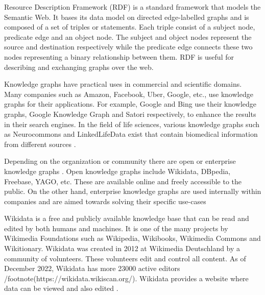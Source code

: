 Resource Description Framework (RDF) is a standard framework that models the Semantic Web. It bases its data model on directed edge-labelled graphs and is composed of a set of triples or statements. Each triple consist of a subject node, predicate edge and an object node. The subject and object nodes represent the source and destination respectively while the predicate edge connects these two nodes representing a binary relationship between them. RDF is useful for describing and exchanging graphs over the web.

Knowledge graphs have practical uses in commercial and scientific domains. Many companies such as Amazon, Facebook, Uber, Google, etc., use knowledge graphs for their applications. For example, Google and Bing use their knowledge graphs, Google Knowledge Graph and Satori respectively, to enhance the results in their search engines. In the field of life sciences, various knowledge graphs such as Neurocommons and LinkedLifeData exist that contain biomedical information from different sources \cite{Nickel2015}.

Depending on the organization or community there are open or enterprise knowledge graphs \cite{Hogan2021}. Open knowledge graphs include Wikidata, DBpedia, Freebase, YAGO, etc. These are available online and freely accessible to the public. On the other hand, enterprise knowledge graphs are used internally within companies and are aimed towards solving their specific use-cases

Wikidata is a free and publicly available knowledge base that can be read and edited by both humans and machines. It is one of the many projects by Wikimedia Foundations such as Wikipedia, Wikibooks, Wikimedia Commons and Wikitionary. Wikidata was created in 2012 at Wikimedia Deutschland by a community of volunteers. These volunteers edit and control all content. As of December 2022, Wikidata has more 23000 active editors /footnote(https://wikidata.wikiscan.org/). Wikidata provides a website where data can be viewed and also edited \cite{Foundationa}. 

